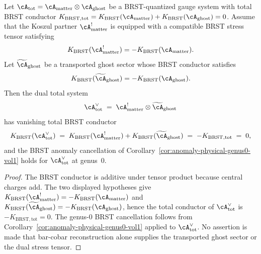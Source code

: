 \begin{proposition}
\label{prop:koszul-brst-anomaly-preservation-vol1}
Let $\cA_{\mathrm{tot}} = \cA_{\mathrm{matter}} \otimes \cA_{\mathrm{ghost}}$
be a BRST-quantized gauge system with total BRST conductor
$K_{\mathrm{BRST,tot}}
=K_{\mathrm{BRST}}(\cA_{\mathrm{matter}})
+K_{\mathrm{BRST}}(\cA_{\mathrm{ghost}})=0$.
Assume that the Koszul partner $\cA_{\mathrm{matter}}^!$ is equipped
with a compatible BRST stress tensor satisfying
\[
K_{\mathrm{BRST}}(\cA_{\mathrm{matter}}^!)
=-K_{\mathrm{BRST}}(\cA_{\mathrm{matter}}).
\]
Let $\widetilde{\cA}_{\mathrm{ghost}}$ be a transported ghost sector
whose BRST conductor satisfies
\[
K_{\mathrm{BRST}}(\widetilde{\cA}_{\mathrm{ghost}})
=-K_{\mathrm{BRST}}(\cA_{\mathrm{ghost}}).
\]
Then the dual total system
\[
 \cA_{\mathrm{tot}}^{\vee}
 \;=\; \cA_{\mathrm{matter}}^! \otimes \widetilde{\cA}_{\mathrm{ghost}}
\]
has vanishing total BRST conductor
\[
 K_{\mathrm{BRST}}(\cA_{\mathrm{tot}}^{\vee})
 \;=\; K_{\mathrm{BRST}}(\cA_{\mathrm{matter}}^!)
 + K_{\mathrm{BRST}}(\widetilde{\cA}_{\mathrm{ghost}})
 \;=\; -K_{\mathrm{BRST,tot}}
 \;=\; 0,
\]
and the BRST anomaly cancellation of
Corollary~\textup{\ref{cor:anomaly-physical-genus0-vol1}} holds for
$\cA_{\mathrm{tot}}^{\vee}$ at genus~$0$.
\end{proposition}

\begin{proof}
The BRST conductor is additive under tensor product because central
charges add. The two displayed hypotheses give
$K_{\mathrm{BRST}}(\cA_{\mathrm{matter}}^!)
=-K_{\mathrm{BRST}}(\cA_{\mathrm{matter}})$ and
$K_{\mathrm{BRST}}(\widetilde{\cA}_{\mathrm{ghost}})
=-K_{\mathrm{BRST}}(\cA_{\mathrm{ghost}})$, hence the total conductor
of $\cA_{\mathrm{tot}}^\vee$ is $-K_{\mathrm{BRST,tot}}=0$. The
genus-$0$ BRST cancellation follows from
Corollary~\ref{cor:anomaly-physical-genus0-vol1} applied to
$\cA_{\mathrm{tot}}^\vee$. No assertion is made that bar-cobar
reconstruction alone supplies the transported ghost sector or the
dual stress tensor.
\end{proof}

